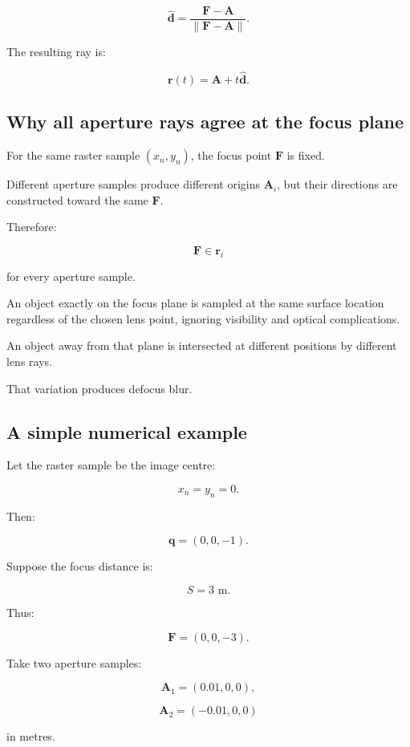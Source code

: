 \[ \boxed{ \hat{\mathbf d} = \frac{\mathbf F-\mathbf A} {\|\mathbf F-\mathbf A\|}. } \]

The resulting ray is:

\[ \boxed{ \mathbf r(t)= \mathbf A+t\hat{\mathbf d}. } \]

\subsection{Why all aperture rays agree at the focus plane}\label{02-foundations-ii-ch036-why-all-aperture-rays-agree-at-the-focus-plane}

For the same raster sample \((x_n,y_n)\), the focus point \(\mathbf F\) is fixed.

Different aperture samples produce different origins \(\mathbf A_i\), but their directions are constructed toward the same \(\mathbf F\).

Therefore:

\[ \boxed{ \mathbf F \in\mathbf r_i } \]

for every aperture sample.

An object exactly on the focus plane is sampled at the same surface location regardless of the chosen lens point, ignoring visibility and optical complications.

An object away from that plane is intersected at different positions by different lens rays.

That variation produces defocus blur.

\subsection{A simple numerical example}\label{02-foundations-ii-ch036-a-simple-numerical-example}

Let the raster sample be the image centre:

\[ x_n=y_n=0. \]

Then:

\[ \mathbf q=(0,0,-1). \]

Suppose the focus distance is:

\[ S=3\text{ m}. \]

Thus:

\[ \boxed{ \mathbf F=(0,0,-3). } \]

Take two aperture samples:

\[ \mathbf A_1=(0.01,0,0), \]

\[ \mathbf A_2=(-0.01,0,0) \]

in metres.


